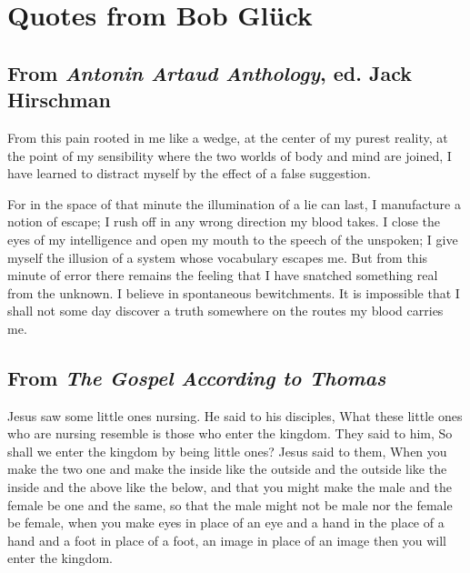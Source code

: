\documentclass[
]{memoir}
\begin{document}
\hypertarget{quotes-from-bob-gluxfcck}{%
\section*{Quotes from Bob Glück}\label{quotes-from-bob-gluxfcck}}

\hypertarget{from-antonin-artaud-anthology-ed.-jack-hirschman}{%
\subsection*{\texorpdfstring{From \emph{Antonin Artaud Anthology}, ed.
Jack
Hirschman}{From Antonin Artaud Anthology, ed. Jack Hirschman}}\label{from-antonin-artaud-anthology-ed.-jack-hirschman}}

From this pain rooted in me like a wedge, at the center of my purest
reality, at the point of my sensibility where the two worlds of body and
mind are joined, I have learned to distract myself by the effect of a
false suggestion.

For in the space of that minute the illumination of a lie can last, I
manufacture a notion of escape; I rush off in any wrong direction my
blood takes. I close the eyes of my intelligence and open my mouth to
the speech of the unspoken; I give myself the illusion of a system whose
vocabulary escapes me. But from this minute of error there remains the
feeling that I have snatched something real from the unknown. I believe
in spontaneous bewitchments. It is impossible that I shall not some day
discover a truth somewhere on the routes my blood carries me.

\hypertarget{from-the-gospel-according-to-thomas}{%
\subsection*{\texorpdfstring{From \emph{The Gospel According to
Thomas}}{From The Gospel According to Thomas}}\label{from-the-gospel-according-to-thomas}}

Jesus saw some little ones nursing. He said to his disciples, What these
little ones who are nursing resemble is those who enter the kingdom.
They said to him, So shall we enter the kingdom by being little ones?
Jesus said to them, When you make the two one and make the inside like
the outside and the outside like the inside and the above like the
below, and that you might make the male and the female be one and the
same, so that the male might not be male nor the female be female, when
you make eyes in place of an eye and a hand in the place of a hand and a
foot in place of a foot, an image in place of an image then you will
enter the kingdom.
\end{document}
